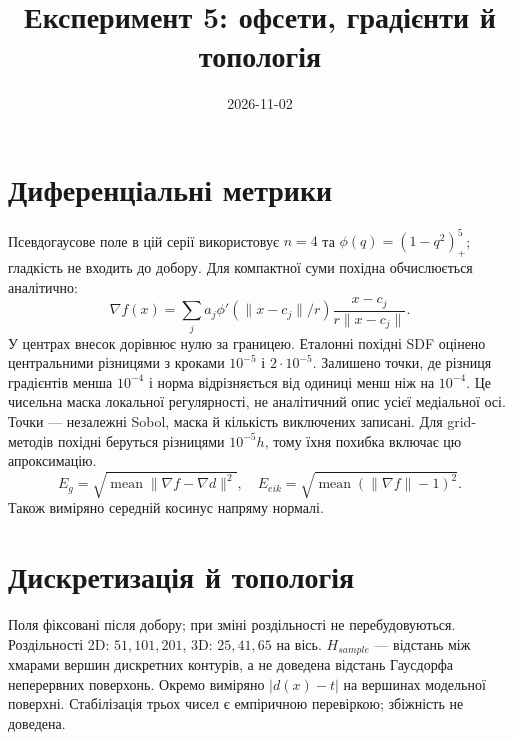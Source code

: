 \documentclass[11pt,a4paper]{article}
\begin{document}
\title{Експеримент 5: офсети, градієнти й топологія}\author{}\date{2026-11-02}\maketitle

\section*{Диференціальні метрики}
Псевдогаусове поле в цій серії використовує $n=4$ та
$\phi(q)=(1-q^2)_+^5$; гладкість не входить до добору.
Для компактної суми похідна обчислюється аналітично:
\[
 \nabla f(x)=\sum_j a_j\phi'(\|x-c_j\|/r)
 \frac{x-c_j}{r\|x-c_j\|}.
\]
У центрах внесок дорівнює нулю за границею.
Еталонні похідні SDF оцінено центральними різницями з кроками
$10^{-5}$ і $2\cdot10^{-5}$. Залишено точки, де різниця градієнтів
менша $10^{-4}$ і норма відрізняється від одиниці менш ніж на $10^{-4}$.
Це чисельна маска локальної регулярності, не аналітичний опис
усієї медіальної осі. Точки --- незалежні Sobol, маска й кількість
виключених записані. Для grid-методів похідні беруться різницями
$10^{-5}h$, тому їхня похибка включає цю апроксимацію.
\[
 E_g=\sqrt{\operatorname{mean}\|\nabla f-\nabla d\|^2},\quad
 E_{eik}=\sqrt{\operatorname{mean}(\|\nabla f\|-1)^2}.
\]
Також виміряно середній косинус напряму нормалі.

\section*{Дискретизація й топологія}
Поля фіксовані після добору; при зміні роздільності не перебудовуються.
Роздільності 2D: $51,101,201$, 3D: $25,41,65$ на вісь.
$H_{sample}$ --- відстань між хмарами вершин дискретних контурів,
а не доведена відстань Гаусдорфа неперервних поверхонь.
Окремо виміряно $|d(x)-t|$ на вершинах модельної поверхні.
Стабілізація трьох чисел є емпіричною перевіркою; збіжність не доведена.
\end{document}
